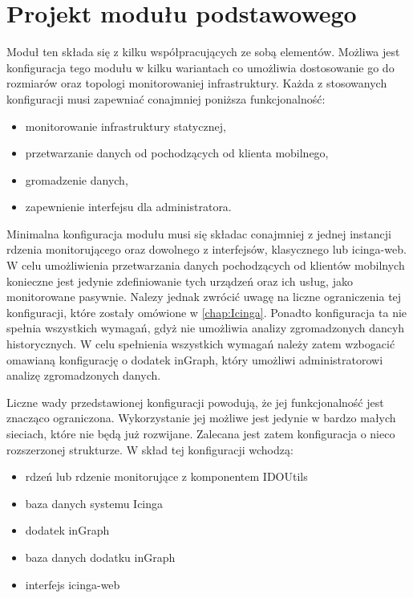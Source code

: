 \section[Projekt modułu podstawowego][Projekt modułu podstawowego]{Projekt modułu podstawowego}

Moduł ten składa się z kilku współpracujących ze sobą
elementów. Możliwa jest konfiguracja tego modułu w kilku wariantach co
umożliwia dostosowanie go do rozmiarów oraz topologi monitorowaniej
infrastruktury. Każda z stosowanych konfiguracji musi zapewniać
conajmniej poniższa funkcjonalność:

\begin{itemize}
\item monitorowanie infrastruktury statycznej,
\item przetwarzanie danych od pochodzących od klienta mobilnego,
\item gromadzenie danych,
\item zapewnienie interfejsu dla administratora.
\end{itemize}

Minimalna konfiguracja modułu musi się składac conajmniej z jednej
instancji rdzenia monitorującego oraz dowolnego z interfejsów,
klasycznego lub icinga-web. W celu umożliwienia przetwarzania danych
pochodzących od klientów mobilnych konieczne jest jedynie
zdefiniowanie tych urządzeń oraz ich usług, jako monitorowane
pasywnie. Nalezy jednak zwrócić uwagę na liczne ograniczenia tej
konfiguracji, które zostały omówione w \ref{chap:Icinga}. Ponadto
konfiguracja ta nie spełnia wszystkich wymagań, gdyż nie umożliwia
analizy zgromadzonych dancyh historycznych. W celu spełnienia
wszystkich wymagań należy zatem wzbogacić omawianą konfigurację o
dodatek inGraph, który umożliwi administratorowi analizę zgromadzonych
danych.

Liczne wady przedstawionej konfiguracji powodują, że jej
funkcjonalność jest znacząco ograniczona. Wykorzystanie jej możliwe
jest jedynie w bardzo małych sieciach, które nie będą już
rozwijane. Zalecana jest zatem konfiguracja o nieco rozszerzonej
strukturze. W skład tej konfiguracji wchodzą:

\begin{itemize}
\item rdzeń lub rdzenie monitorujące z komponentem IDOUtils
\item baza danych systemu Icinga
\item dodatek inGraph
\item baza danych dodatku inGraph
\item interfejs icinga-web
\end{itemize}

